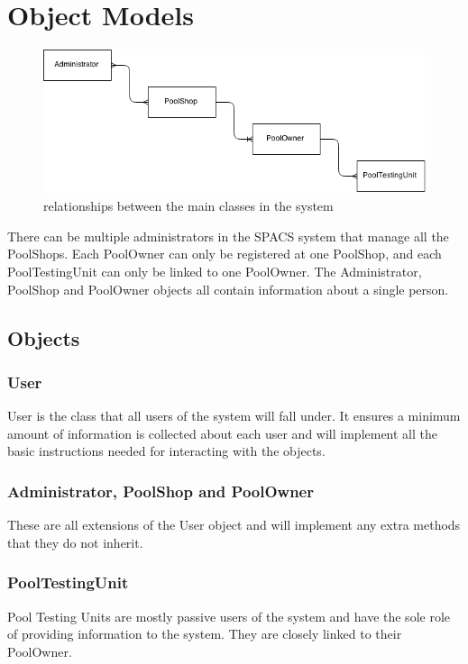 \section{Object Models}

\begin{figure}[h!]
\begin{center}
	\includegraphics[width=15cm]{images/ObjectRelations}
	\caption{relationships between the main classes in the system}
\end{center}
\end{figure}

\par
There can be multiple administrators in the SPACS system that manage all the PoolShops. Each PoolOwner can only be registered at one PoolShop, and each PoolTestingUnit can only be linked to one PoolOwner. The Administrator, PoolShop and PoolOwner objects all contain information about a single person.

\subsection{Objects}
\subsubsection{User}
User is the class that all users of the system will fall under. It ensures a minimum amount of information is collected about each user and will implement all the basic instructions needed for interacting with the objects.

\subsubsection{Administrator, PoolShop and PoolOwner}
These are all extensions of the User object and will implement any extra methods that they do not inherit.

\subsubsection{PoolTestingUnit}
Pool Testing Units are mostly passive users of the system and have the sole role of providing information to the system. They are closely linked to their PoolOwner.
